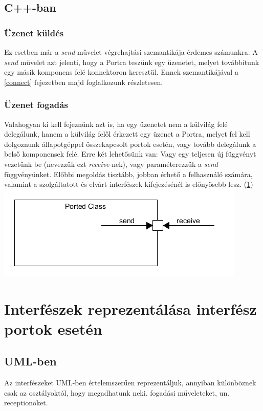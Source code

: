 \documentclass[a4paper,12pt]{report}
\begin{document}
\subsection{C++-ban}
\subsubsection{Üzenet küldés}
Ez esetben már a \textit{send} művelet végrehajtási szemantikája érdemes számunkra. A \textit{send} művelet azt jelenti, hogy a Portra teszünk egy üzenetet, melyet továbbítunk egy másik komponens felé konnektoron keresztül. Ennek szemantikájával a \ref{connect} fejezetben majd foglalkozunk részletesen.

\subsubsection{Üzenet fogadás}
Valahogyan ki kell fejeznünk azt is, ha egy üzenetet nem a külvilág felé delegálunk, hanem a külvilág felől érkezett egy üzenet a Portra, melyet fel kell dolgoznunk állapotgéppel összekapcsolt portok esetén, vagy tovább delegálunk a belső komponensek felé. Erre két lehetősünk van: Vagy egy teljesen új függvényt vezetünk be (nevezzük ezt \textit{receive}-nek), vagy paraméterezzük a \textit{send} függvényünket. Előbbi megoldás tisztább, jobban érhető a felhasználó számára, valamint a szolgáltatott és elvárt interfészek kifejezésénél is előnyösebb lesz. (\ref{inf}) \\

\includegraphics[scale=0.8]{send_rec.png}

\section{Interfészek reprezentálása interfész portok esetén} \label{inf}
\subsection{UML-ben}
Az interfészeket UML-ben értelemszerűen reprezentáljuk, annyiban különböznek csak az osztályoktól, hogy megadhatunk neki. fogadási műveleteket, un. receptionöket.
\end{document}
